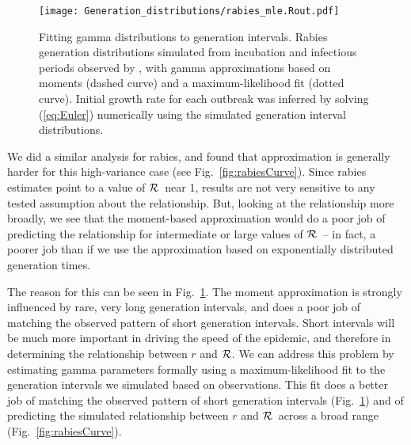 \documentclass[12pt]{article}
\newcommand{\RR}{\ensuremath{{\cal R}}}
\newcommand{\eref}[1]{(\ref{eq:#1})}
\newcommand{\fref}[1]{Fig.~\ref{fig:#1}}
\begin{document}
{\begin{figure}[htbp] \centering
	\texttt{[image: Generation\_distributions/rabies\_mle.Rout.pdf]}
	\caption{
		Fitting gamma distributions to generation intervals. 
		Rabies generation distributions simulated from incubation and infectious periods observed by \cite{HampDush09}, with gamma approximations based on moments (dashed curve) and a maximum-likelihood fit (dotted curve). Initial growth rate for each outbreak was inferred by solving \eref{Euler} numerically using the simulated generation interval distributions.
	}
	\label{fig:rabiesHist}
\end{figure}

We did a similar analysis for rabies, and found that approximation is generally harder for this high-variance case (see \fref{rabiesCurve}). Since rabies estimates point to a value of \RR\ near 1, results are not very sensitive to any tested assumption about the relationship. But, looking at the relationship more broadly, we see that the moment-based approximation would do a poor job of predicting the relationship for intermediate or large values of \RR\ -- in fact, a poorer job than if we use the approximation based on exponentially distributed generation times. 

The reason for this can be seen in \fref{rabiesHist}. The moment approximation is strongly influenced by rare, very long generation intervals, and does a poor job of matching the observed pattern of short generation intervals. Short intervals will be much more important in driving the speed of the epidemic, and therefore in determining the relationship between $r$ and \RR. We can address this problem by estimating gamma parameters formally using a maximum-likelihood fit to the generation intervals we simulated based on observations. This fit does a better job of matching the observed pattern of short generation intervals (\fref{rabiesHist}) and of predicting the simulated relationship between $r$ and \RR\ across a broad range (\fref{rabiesCurve}).

}
\end{document}
